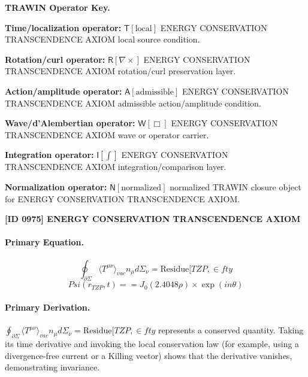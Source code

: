 \par\vspace{0.45\baselineskip}
\noindent\begin{minipage}[t]{\linewidth}
\begingroup
\small
\raggedright
\textbf{TRAWIN Operator Key.}\par
\noindent\textbf{Time/localization operator:} $\mathsf{T}\!\left[\mathrm{local}\right]$ ENERGY CONSERVATION TRANSCENDENCE AXIOM local source condition.\par
\noindent\textbf{Rotation/curl operator:} $\mathsf{R}\!\left[\nabla\times\right]$ ENERGY CONSERVATION TRANSCENDENCE AXIOM rotation/curl preservation layer.\par
\noindent\textbf{Action/amplitude operator:} $\mathsf{A}\!\left[\mathrm{admissible}\right]$ ENERGY CONSERVATION TRANSCENDENCE AXIOM admissible action/amplitude condition.\par
\noindent\textbf{Wave/d'Alembertian operator:} $\mathsf{W}\!\left[\Box\right]$ ENERGY CONSERVATION TRANSCENDENCE AXIOM wave or operator carrier.\par
\noindent\textbf{Integration operator:} $\mathsf{I}\!\left[\int\right]$ ENERGY CONSERVATION TRANSCENDENCE AXIOM integration/comparison layer.\par
\noindent\textbf{Normalization operator:} $\mathsf{N}\!\left[\mathrm{normalized}\right]$ normalized TRAWIN closure object for ENERGY CONSERVATION TRANSCENDENCE AXIOM.\par
\endgroup
\end{minipage}

\clearpage
\noindent\textbf{[ID 0975] ENERGY CONSERVATION TRANSCENDENCE AXIOM}\par
\vspace{0.35em}
\paragraph{Primary Equation.}
\[
\oint_{\partial \Sigma} \langle T^{\mu\nu} \rangle_{vac} n_\mu d\Sigma_\nu = \text{Residue}[TZP, \in fty
\]
\[
Psi(r_{TZP}, t) == J_0(2.4048 \rho) \times \exp(i n \theta)
\]

\paragraph{Primary Derivation.}
\( \oint_{\partial \Sigma} \langle T^{\mu\nu} \rangle_{vac} n_\mu d\Sigma_\nu = \text{Residue}[TZP, \in fty \) represents a conserved quantity. Taking its time derivative and invoking the local conservation law (for example, using a divergence-free current or a Killing vector) shows that the derivative vanishes, demonstrating invariance.
